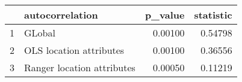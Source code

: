 \begin{table}[ht]
\centering
\begin{tabular}{rlrr}
  \hline
 & autocorrelation & p\_value & statistic \\ 
  \hline
1 & GLobal & 0.00100 & 0.54798 \\ 
  2 & OLS location attributes & 0.00100 & 0.36556 \\ 
  3 & Ranger location attributes & 0.00050 & 0.11219 \\ 
   \hline
\end{tabular}
\end{table}
